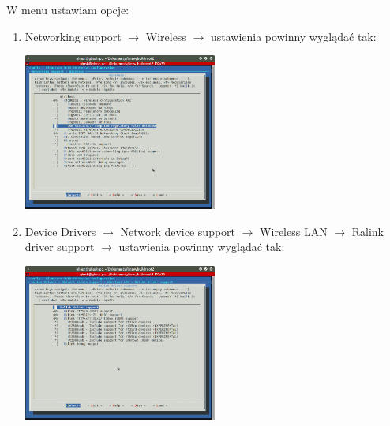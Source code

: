 W menu ustawiam opcje:
\begin{enumerate}
\item Networking support $\rightarrow$ Wireless $\rightarrow$ ustawienia powinny wyglądać tak:

\begin{center}
\includegraphics[width=0.5\textwidth]{NetworkingSupport_Wireless.png}
\end{center}

\item Device Drivers $\rightarrow$ Network device support $\rightarrow$ Wireless LAN $\rightarrow$ Ralink driver support $\rightarrow$ ustawienia powinny wyglądać tak:

\begin{center}
\includegraphics[width=0.5\textwidth]{DeviceDrivers.png}
\end{center}

\end{enumerate}

